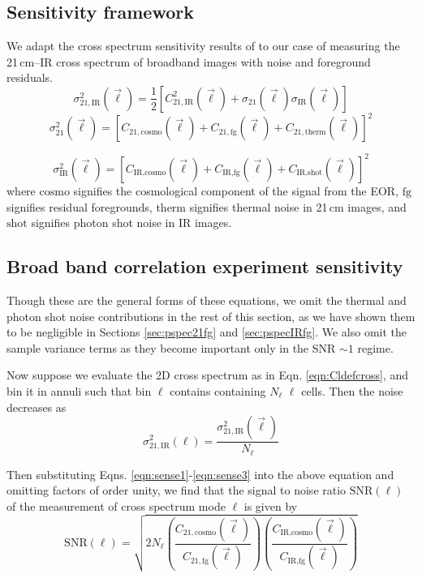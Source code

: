\documentclass[preprint]{aastex}
\newcommand{\IR}{\text{IR}}
\newcommand{\therm}{\text{therm}}
\newcommand{\cosmo}{\text{cosmo}}
\newcommand{\fg}{\text{fg}}
\newcommand{\shot}{\text{shot}}
\newcommand{\SNR}{\text{SNR}}
\begin{document}
\subsection{Sensitivity framework}
We adapt the cross spectrum sensitivity results of \citet{lidz09} to our case of measuring the 21\,cm--IR cross spectrum of broadband images with noise and foreground residuals. 
\begin{equation}
\label{eqn:sense1}
	\sigma_{21,\IR}^2(\vec{\ell})=\frac{1}{2}[C^2_{21,\IR}(\vec{\ell})+\sigma_{21}(\vec{\ell})\sigma_{\IR}(\vec{\ell})]
\end{equation}
\begin{equation}
\label{eqn:sense2}
	\sigma_{21}^2(\vec{\ell})=[C_{21,\cosmo}(\vec{\ell})+C_{21,\fg}(\vec{\ell})+C_{21,\therm}(\vec{\ell})]^2
\end{equation}

\begin{equation}
\label{eqn:sense3}
	\sigma_{\IR}^2(\vec{\ell})=[C_{\IR,\cosmo}(\vec{\ell})+C_{\IR,\fg}(\vec{\ell})+C_{\IR,\shot}(\vec{\ell})]^2
\end{equation}
where $\cosmo$ signifies the cosmological component of the signal from the EOR, $\fg$ signifies residual foregrounds, $\therm$ signifies thermal noise in 21\,cm images, and $\shot$ signifies photon shot noise in IR images. 

\subsection{Broad band correlation experiment sensitivity}

Though these are the general forms of these equations, we omit the thermal and photon shot noise contributions in the rest of this section, as we have shown them to be negligible in Sections \ref{sec:pspec21fg} and \ref{sec:pspecIRfg}. We also omit the sample variance terms as they become important only in the SNR $\sim1$ regime. 

Now suppose we evaluate the 2D cross spectrum as in Eqn. \ref{eqn:Cldefcross}, and bin it in annuli such that bin $\ell$ contains containing $N_\ell$ $\ell$ cells. Then the noise decreases as
\begin{equation}
	\sigma_{21,\IR}^2(\ell) = \frac{\sigma_{21,\IR}^2(\vec{\ell}) }{N_\ell}
\end{equation}

Then substituting Eqns. \ref{eqn:sense1}-\ref{eqn:sense3} into the above equation and omitting factors of order unity, we find that the signal to noise ratio $\SNR(\ell)$ of the measurement of cross spectrum mode $\ell$ is given by
\begin{equation}
	\SNR(\ell) = \sqrt{
		2N_\ell
	\left(\frac{C_{21,\cosmo}(\vec{\ell})  }{ C_{21,\fg}(\vec{\ell}) }\right)
	\left(\frac{C_{\IR,\cosmo}(\vec{\ell})  }{ C_{\IR,\fg}(\vec{\ell}) }\right)
	}
\end{equation}
\end{document}
